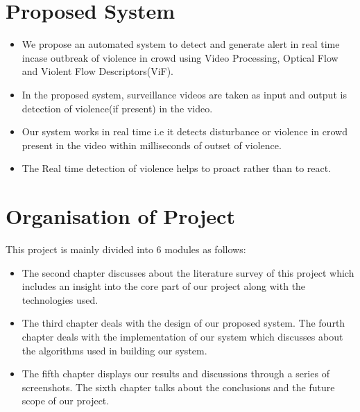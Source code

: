 \section{Proposed System}
\begin{itemize}
  \item We propose an automated system to detect and generate alert in real time incase outbreak of violence in crowd using Video Processing, Optical Flow and Violent Flow Descriptors(ViF). 
  \item In the proposed system, surveillance videos are taken as input and output is detection of violence(if present) in the video.
  \item Our system works in real time i.e it detects disturbance or violence in crowd present in the video within milliseconds of outset of violence. 
  \item The Real time detection of violence helps to proact rather than to react.
\end{itemize}
\section{Organisation of Project}
This project is mainly divided into 6 modules as follows:
\begin{itemize}
  \item The second chapter discusses about the literature survey of this project which includes an insight into the core part of our project along with the technologies used.
  \item The third chapter deals with the design of our proposed system. The fourth chapter deals with the implementation of our system which discusses about the algorithms used in building our system.
  \item The fifth chapter displays our results and discussions through a series of screenshots. The sixth chapter talks about the conclusions and the future scope of our project. 
\end{itemize}


